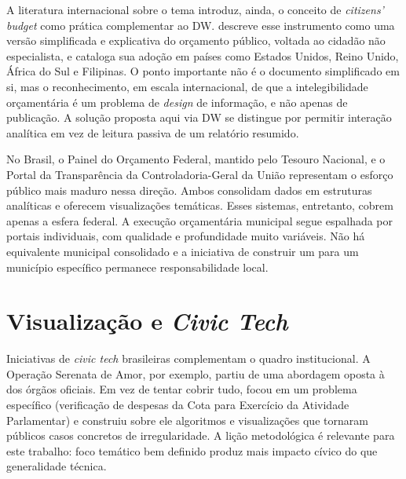 A literatura internacional sobre o tema introduz, ainda, o conceito de \textit{citizens' budget} como prática complementar ao DW.  descreve esse instrumento como uma versão simplificada e explicativa do orçamento público, voltada ao cidadão não especialista, e cataloga sua adoção em países como Estados Unidos, Reino Unido, África do Sul e Filipinas. O ponto importante não é o documento simplificado em si, mas o reconhecimento, em escala internacional, de que a intelegibilidade orçamentária é um problema de \textit{design} de informação, e não apenas de publicação. A solução proposta aqui via DW se distingue por permitir interação analítica em vez de leitura passiva de um relatório resumido.

No Brasil, o Painel do Orçamento Federal, mantido pelo Tesouro Nacional, e o Portal da Transparência da Controladoria-Geral da União representam o esforço público mais maduro nessa direção. Ambos consolidam dados em estruturas analíticas e oferecem visualizações temáticas. Esses sistemas, entretanto, cobrem apenas a esfera federal. A execução orçamentária municipal segue espalhada por portais individuais, com qualidade e profundidade muito variáveis. Não há equivalente municipal consolidado e a iniciativa de construir um para um município específico permanece responsabilidade local.


\section{Visualização e \textit{Civic Tech}}

Iniciativas de \textit{civic tech} brasileiras complementam o quadro institucional. A Operação Serenata de Amor, por exemplo, partiu de uma abordagem oposta à dos órgãos oficiais. Em vez de tentar cobrir tudo, focou em um problema específico (verificação de despesas da Cota para Exercício da Atividade Parlamentar) e construiu sobre ele algoritmos e visualizações que tornaram públicos casos concretos de irregularidade. A lição metodológica é relevante para este trabalho: foco temático bem definido produz mais impacto cívico do que generalidade técnica.

